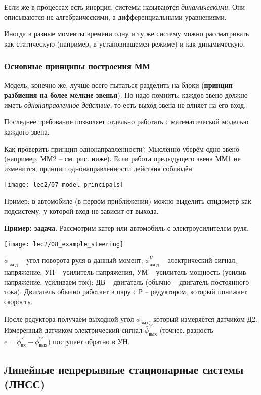 \documentclass[main.tex]{subfiles}
\begin{document}
Если же в процессах есть инерция, системы называются \emph{динамическими}.
Они описываются не алгебраическими, а дифференциальными уравнениями.

Иногда в разные моменты времени одну и ту же систему можно рассматривать как статическую (например, в установившемся режиме) и как динамическую.

\subsubsection{Основные принципы построения ММ}

Модель, конечно же, лучше всего пытаться разделить на блоки (\textbf{принцип разбиения на более мелкие звенья}).
Но надо помнить: каждое звено должно иметь \emph{однонаправленное действие}, то есть выход звена не влияет на его вход.

Последнее требование позволяет отдельно работать с математической моделью каждого звена.

Как проверить принцип однонаправленности?
Мысленно уберём одно звено (например, ММ2 -- см. рис. ниже).
Если работа предыдущего звена ММ1 не изменится, принцип однонаправленности действия соблюдён.

\texttt{[image: lec2/07\_model\_principals]}

Пример: в автомобиле (в первом приближении) можно выделить спидометр как подсистему, у которой вход не зависит от выхода.

\textbf{Пример: задача}. Рассмотрим катер или автомобиль с электроусилителем руля.

\texttt{[image: lec2/08\_example\_steering]}

$ \phi_{\text{вход}} $ -- угол поворота руля в данный момент;  $ \phi_{\text{вход}}^V $ -- электрический сигнал, напряжение; УН -- усилитель напряжения, УМ -- усилитель мощность (усилив напряжение, усиливаем ток); ДВ -- двигатель (обычно -- двигатель постоянного тока).
Двигатель обычно работает в пару с Р -- редуктором, который понижает скорость.

После редуктора получаем выходной угол $ \phi_{\text{вых}} $, который измеряется датчиком Д2.
Измеренный датчиком электрический сигнал $ \bar \phi_{\text{вых}}^V $ (точнее, разность $ e = \bar \phi_{\text{вх}}^V - \phi_{\text{вых}}^V $) поступает обратно в УН.


\subsection{Линейные непрерывные стационарные системы (ЛНСС)}
\end{document}
